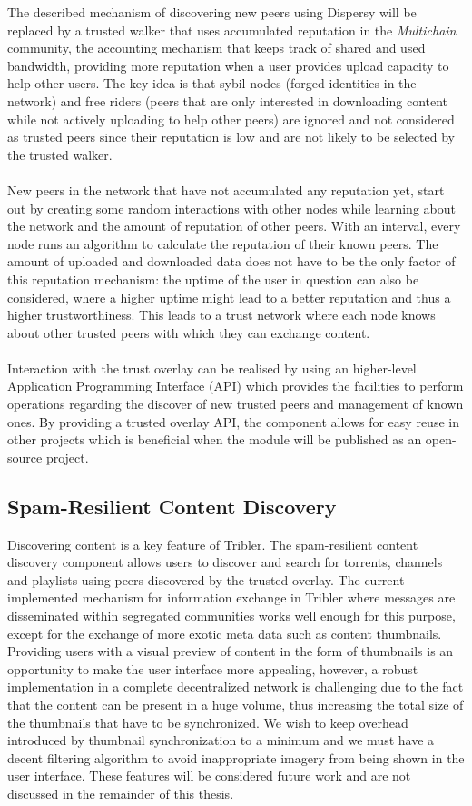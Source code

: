 \noindent The described mechanism of discovering new peers using Dispersy will be replaced by a trusted walker that uses accumulated reputation in the \emph{Multichain} community, the accounting mechanism that keeps track of shared and used bandwidth, providing more reputation when a user provides upload capacity to help other users. The key idea is that sybil nodes (forged identities in the network) and free riders (peers that are only interested in downloading content while not actively uploading to help other peers) are ignored and not considered as trusted peers since their reputation is low and are not likely to be selected by the trusted walker.\\\\
New peers in the network that have not accumulated any reputation yet, start out by creating some random interactions with other nodes while learning about the network and the amount of reputation of other peers. With an interval, every node runs an algorithm to calculate the reputation of their known peers. The amount of uploaded and downloaded data does not have to be the only factor of this reputation mechanism: the uptime of the user in question can also be considered, where a higher uptime might lead to a better reputation and thus a higher trustworthiness. This leads to a trust network where each node knows about other trusted peers with which they can exchange content.\\\\
Interaction with the trust overlay can be realised by using an higher-level Application Programming Interface (API) which provides the facilities to perform operations regarding the discover of new trusted peers and management of known ones. By providing a trusted overlay API, the component allows for easy reuse in other projects which is beneficial when the module will be published as an open-source project.

\subsection{Spam-Resilient Content Discovery}
Discovering content is a key feature of Tribler. The spam-resilient content discovery component allows users to discover and search for torrents, channels and playlists using peers discovered by the trusted overlay. The current implemented mechanism for information exchange in Tribler where messages are disseminated within segregated communities works well enough for this purpose, except for the exchange of more exotic  meta data such as content thumbnails. Providing users with a visual preview of content in the form of thumbnails is an opportunity to make the user interface more appealing, however, a robust implementation in a complete decentralized network is challenging due to the fact that the content can be present in a huge volume, thus increasing the total size of the thumbnails that have to be synchronized. We wish to keep overhead introduced by thumbnail synchronization to a minimum and we must have a decent filtering algorithm to avoid inappropriate imagery from being shown in the user interface. These features will be considered future work and are not discussed in the remainder of this thesis.

